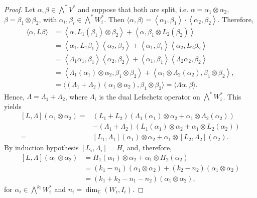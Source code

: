 \begin{proof}
Let $\alpha, \beta \in \bigwedge^* V^*$ and suppose that both are split, i.e. $\alpha=\alpha_1 \otimes \alpha_2$, $\beta=\beta_1 \otimes \beta_2$, with $\alpha_i, \beta_i \in \bigwedge^* W_i^*$. Then $\langle\alpha, \beta\rangle=\left\langle\alpha_1, \beta_1\right\rangle \cdot\left\langle\alpha_2, \beta_2\right\rangle$. Therefore,
$$
\begin{aligned}
\langle\alpha, L \beta\rangle & =\left\langle\alpha, L_1\left(\beta_1\right) \otimes \beta_2\right\rangle+\left\langle\alpha, \beta_1 \otimes L_2\left(\beta_2\right)\right\rangle \\
& =\left\langle\alpha_1, L_1 \beta_1\right\rangle\left\langle\alpha_2, \beta_2\right\rangle+\left\langle\alpha_1, \beta_1\right\rangle\left\langle\alpha_2, L_2 \beta_2\right\rangle \\
& =\left\langle\Lambda_1 \alpha_1, \beta_1\right\rangle\left\langle\alpha_2, \beta_2\right\rangle+\left\langle\alpha_1, \beta_1\right\rangle\left\langle\Lambda_2 \alpha_2, \beta_2\right\rangle \\
& =\left\langle\Lambda_1\left(\alpha_1\right) \otimes \alpha_2, \beta_1 \otimes \beta_2\right\rangle+\left\langle\alpha_1 \otimes \Lambda_2\left(\alpha_2\right), \beta_1 \otimes \beta_2\right\rangle ,\\ &=\langle(\Lambda_1+\Lambda_2)(\alpha_1\otimes\alpha_2),\beta_1\otimes\beta_2\rangle=\langle\Lambda\alpha,\beta\rangle.
\end{aligned}
$$
Hence, $\Lambda=\Lambda_1+\Lambda_2$, where $\Lambda_i$ is the dual Lefschetz operator on $\bigwedge^* W_i^*$. This yields
$$
\begin{aligned}
{[L, \Lambda]\left(\alpha_1 \otimes \alpha_2\right)=} & \left(L_1+L_2\right)\left(\Lambda_1\left(\alpha_1\right) \otimes \alpha_2+\alpha_1 \otimes \Lambda_2\left(\alpha_2\right)\right) \\
& -\left(\Lambda_1+\Lambda_2\right)\left(L_1\left(\alpha_1\right) \otimes \alpha_2+\alpha_1 \otimes L_2\left(\alpha_2\right)\right) \\
= & {\left[L_1, \Lambda_1\right]\left(\alpha_1\right) \otimes \alpha_2+\alpha_1 \otimes\left[L_2, \Lambda_2\right]\left(\alpha_2\right) . }
\end{aligned}
$$
By induction hypothesis $\left[L_i, \Lambda_i\right]=H_i$ and, therefore,
$$
\begin{aligned}
{[L, \Lambda]\left(\alpha_1 \otimes \alpha_2\right) } & =H_1\left(\alpha_1\right) \otimes \alpha_2+\alpha_1 \otimes H_2\left(\alpha_2\right) \\
& =\left(k_1-n_1\right)\left(\alpha_1 \otimes \alpha_2\right)+\left(k_2-n_2\right)\left(\alpha_1 \otimes \alpha_2\right) \\
& =\left(k_1+k_2-n_1-n_2\right)\left(\alpha_1 \otimes \alpha_2\right),
\end{aligned}
$$
for $\alpha_i \in \bigwedge^{k_i} W_i^*$ and $n_i=\operatorname{dim}_{\mathbb{C}}\left(W_i, I_i\right)$.


\end{proof}
